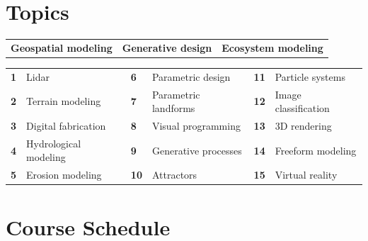\documentclass[11pt,article,oneside]{memoir}
\begin{document}

\section{Topics}
%
\begin{table}[H]
\begin{tabular}{l @{\hskip 1.25cm} l @{\hskip 1.8cm} l}
\textbf{Geospatial modeling} & \textbf{Generative design} & \textbf{Ecosystem modeling}\\
\end{tabular}
\end{table}
%
\vspace*{-1em}
%
\begin{table}[H]
\begin{tabular}{l l l l l l}
\small
\textbf{1} & Lidar & \textbf{6} & Parametric design & \textbf{11} & Particle systems\\
\textbf{2} & Terrain modeling & \textbf{7} & Parametric landforms & \textbf{12} & Image classification\\
\textbf{3} & Digital fabrication & \textbf{8} & Visual programming & \textbf{13} & 3D rendering\\
\textbf{4} & Hydrological modeling & \textbf{9} & Generative processes & \textbf{14} & Freeform modeling\\
\textbf{5} & Erosion modeling & \textbf{10} & Attractors & \textbf{15} & Virtual reality\\
\end{tabular}
\end{table}
%


\clearpage

\section{Course Schedule}
\end{document}
